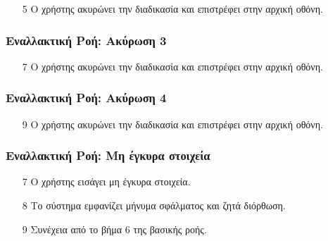 \begin{enumerate}
    \item[5] Ο χρήστης ακυρώνει την διαδικασία και επιστρέφει στην αρχική οθόνη.
\end{enumerate}

\subsubsection{Εναλλακτική Ροή: Ακύρωση 3}

\begin{enumerate}
    \item[7] Ο χρήστης ακυρώνει την διαδικασία και επιστρέφει στην αρχική οθόνη.
\end{enumerate}

\subsubsection{Εναλλακτική Ροή: Ακύρωση 4}

\begin{enumerate}
    \item[9] Ο χρήστης ακυρώνει την διαδικασία και επιστρέφει στην αρχική οθόνη.
\end{enumerate}

\subsubsection{Εναλλακτική Ροή: Μη έγκυρα στοιχεία}

\begin{enumerate}
    \item[7] Ο χρήστης εισάγει μη έγκυρα στοιχεία.
    \item[8] Το σύστημα εμφανίζει μήνυμα σφάλματος και ζητά διόρθωση.
    \item[9] Συνέχεια από το βήμα 6 της βασικής ροής.
\end{enumerate}
